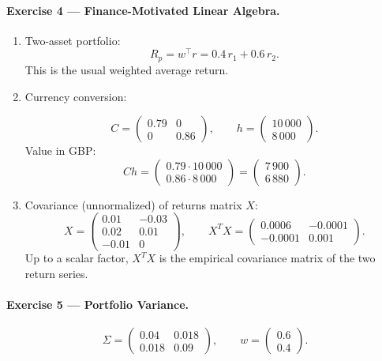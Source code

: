 \documentclass[11pt]{article}
\begin{document}
\bigskip

\paragraph{Exercise 4 — Finance-Motivated Linear Algebra.}

\begin{enumerate}
\item Two-asset portfolio:
\[
R_p = w^\top r = 0.4\,r_1 + 0.6\,r_2.
\]
This is the usual weighted average return.

\item Currency conversion:

\[
C =
\begin{pmatrix}
0.79 & 0 \\
0 & 0.86
\end{pmatrix},
\qquad
h =
\begin{pmatrix}
10\,000\\
8\,000
\end{pmatrix}.
\]
Value in GBP:
\[
Ch =
\begin{pmatrix}
0.79\cdot 10\,000\\
0.86\cdot 8\,000
\end{pmatrix}
=
\begin{pmatrix}
7\,900\\
6\,880
\end{pmatrix}.
\]

\item Covariance (unnormalized) of returns matrix $X$:
\[
X =
\begin{pmatrix}
0.01 & -0.03 \\
0.02 & 0.01 \\
-0.01 & 0
\end{pmatrix},
\qquad
X^T X =
\begin{pmatrix}
0.0006 & -0.0001\\
-0.0001 & 0.001
\end{pmatrix}.
\]
Up to a scalar factor, $X^TX$ is the empirical covariance matrix of the two return series.
\end{enumerate}

\bigskip

\paragraph{Exercise 5 — Portfolio Variance.}

\[
\Sigma =
\begin{pmatrix}
0.04 & 0.018\\
0.018 & 0.09
\end{pmatrix},
\qquad
w =
\begin{pmatrix}
0.6\\0.4
\end{pmatrix}.
\]
\end{document}
